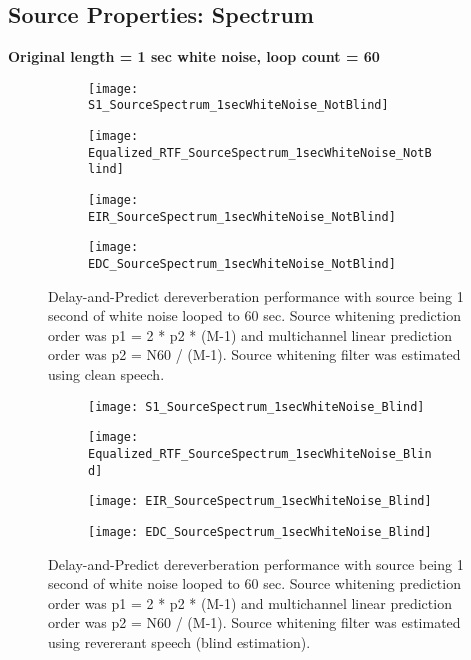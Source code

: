 \subsection{Source Properties: Spectrum}

\textbf{Original length = 1 sec white noise, loop count = 60}

\begin{figure}[H]
	\centering
	\begin{subfigure}[b]{0.49\textwidth}
		\centering
		\texttt{[image: S1\_SourceSpectrum\_1secWhiteNoise\_NotBlind]}
	\end{subfigure}
	\hfill
	\begin{subfigure}[b]{0.49\textwidth}
		\centering
		\texttt{[image: Equalized\_RTF\_SourceSpectrum\_1secWhiteNoise\_NotBlind]}
	\end{subfigure}
	\hfill
	\begin{subfigure}[b]{0.49\textwidth}
		\centering
		\texttt{[image: EIR\_SourceSpectrum\_1secWhiteNoise\_NotBlind]}
	\end{subfigure}
	\hfill
	\begin{subfigure}[b]{0.49\textwidth}
		\centering
		\texttt{[image: EDC\_SourceSpectrum\_1secWhiteNoise\_NotBlind]}
	\end{subfigure}
	\hfill
	\caption{Delay-and-Predict dereverberation performance with source being 1 second of white noise looped to 60 sec. Source whitening prediction order was p1 = 2 * p2 * (M-1) and multichannel linear prediction order was p2 = N60 / (M-1). Source whitening filter was estimated using clean speech.}
	\label{fig:params_source_spectrum_1sec_not_blind}
\end{figure}

\begin{figure}[H]
	\centering
	\begin{subfigure}[b]{0.49\textwidth}
		\centering
		\texttt{[image: S1\_SourceSpectrum\_1secWhiteNoise\_Blind]}
	\end{subfigure}
	\hfill
	\begin{subfigure}[b]{0.49\textwidth}
		\centering
		\texttt{[image: Equalized\_RTF\_SourceSpectrum\_1secWhiteNoise\_Blind]}
	\end{subfigure}
	\hfill
	\begin{subfigure}[b]{0.49\textwidth}
		\centering
		\texttt{[image: EIR\_SourceSpectrum\_1secWhiteNoise\_Blind]}
	\end{subfigure}
	\hfill
	\begin{subfigure}[b]{0.49\textwidth}
		\centering
		\texttt{[image: EDC\_SourceSpectrum\_1secWhiteNoise\_Blind]}
	\end{subfigure}
	\hfill
	\caption{Delay-and-Predict dereverberation performance with source being 1 second of white noise looped to 60 sec. Source whitening prediction order was p1 = 2 * p2 * (M-1) and multichannel linear prediction order was p2 = N60 / (M-1). Source whitening filter was estimated using revererant speech (blind estimation).}
	\label{fig:params_source_spectrum_1sec_blind}
\end{figure}


